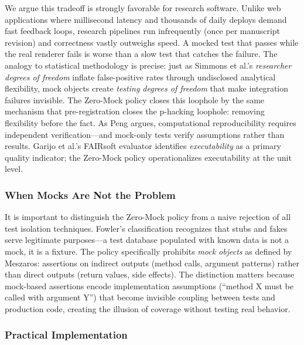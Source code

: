 \documentclass[
  english,
]{article}
\begin{document}
We argue this tradeoff is strongly favorable for research software.
Unlike web applications where millisecond latency and thousands of daily
deploys demand fast feedback loops, research pipelines run infrequently
(once per manuscript revision) and correctness vastly outweighs speed. A
mocked test that passes while the real renderer fails is worse than a
slow test that catches the failure. The analogy to statistical
methodology is precise: just as Simmons et al.'s \emph{researcher
degrees of freedom} \citep{simmons2011falsepositive} inflate
false-positive rates through undisclosed analytical flexibility, mock
objects create \emph{testing degrees of freedom} that make integration
failures invisible. The Zero-Mock policy closes this loophole by the
same mechanism that pre-registration \citep{nosek2018preregistration}
closes the p-hacking loophole: removing flexibility before the fact. As
Peng \citep{peng2011reproducible} argues, computational reproducibility
requires independent verification---and mock-only tests verify
assumptions rather than results. Garijo et al.'s FAIRsoft evaluator
\citep{garijo2024fairsoft} identifies \emph{executability} as a primary
quality indicator; the Zero-Mock policy operationalizes executability at
the unit level.

\subsubsection{When Mocks Are Not the
Problem}\label{when-mocks-are-not-the-problem}

It is important to distinguish the Zero-Mock policy from a naive
rejection of all test isolation techniques. Fowler's classification
\citep{martin2008clean} recognizes that stubs and fakes serve legitimate
purposes---a test database populated with known data is not a mock, it
is a fixture. The policy specifically prohibits \emph{mock objects} as
defined by Meszaros: assertions on indirect outputs (method calls,
argument patterns) rather than direct outputs (return values, side
effects). The distinction matters because mock-based assertions encode
implementation assumptions (``method X must be called with argument Y'')
that become invisible coupling between tests and production code,
creating the illusion of coverage without testing real behavior.

\subsubsection{Practical Implementation}\label{practical-implementation}
\end{document}
